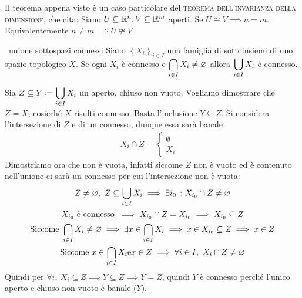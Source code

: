 \begin{observe}
	Il teorema appena visto è un caso particolare del \textsc{teorema dell'invarianza della dimensione}, che cita: \newline
	Siano $U\subseteq\mathbb{R}^n, V\subseteq\mathbb{R}^m$ aperti. Se $U\cong V \implies n=m$. Equivalentemente $n\neq m\implies U\ncong V$
\end{observe}

\begin{theorema}~{unione sottospazi connessi}
	Siano $\left\{ X_i \right\}_{i\in I}$ una famiglia di sottoinsiemi di uno spazio topologico $X$. Se ogni $X_i$ è connesso e $\displaystyle\mathop{{\bigcap}}\displaylimits_{i\in I}X_i\neq\varnothing$ allora $\displaystyle\mathop{{\bigcup}}\displaylimits_{i\in I}X_i$ è connesso.	
\end{theorema}
\begin{demonstration}
	Sia $\displaystyle Z\subseteq Y\coloneqq \mathop{{\bigcup}}\displaylimits_{i\in I}X_i$ un aperto, chiuso non vuoto. Vogliamo dimostrare che $Z=X$, cosicché $X$ risulti connesso. Basta l'inclusione $Y\subseteq Z$.\newline
	Si considera l'intersezione di $Z$ e di un connesso, dunque essa sarà banale
	\begin{gather*}
		X_i \cap Z = \begin{cases}
			\emptyset & \\
			X_i	&		
		\end{cases}
	\end{gather*}
	Dimostriamo ora che non è vuota, infatti siccome $Z$ non è vuoto ed è contenuto nell'unione ci sarà un connesso per cui l'intersezione non è vuota:
		\begin{gather*}
			Z\neq\varnothing, \ Z\subseteq \mathop{{\bigcup}}\displaylimits_{i\in I}X_i \implies \exists i_0 \ \colon X_{i_0}\cap Z\neq \varnothing	\\
			X_{i_0} \text{ è connesso } \implies X_{i_0}\cap Z=X_{i_0} \implies X_{i_0}\subseteq Z \\
			\text{Siccome } \mathop{{\bigcap}}\displaylimits_{i\in I}X_i\neq\varnothing \implies \exists x\in\mathop{{\bigcap}}\displaylimits_{i\in I}X_i \implies x\in X_{i_0}\subseteq Z \implies x\in Z	\\
			\text{Siccome } x\in\mathop{{\bigcap}}\displaylimits_{i\in I}X_i \text{e} x\in Z \implies \forall i\in I, \ X_i\cap Z\neq\varnothing
		\end{gather*}
	Quindi per $\forall i, \ X_i\subseteq Z \implies Y\subseteq Z \implies Y=Z$, quindi $Y$ è connesso perché l'unico aperto e chiuso non vuoto è banale ($Y$).
\end{demonstration}

